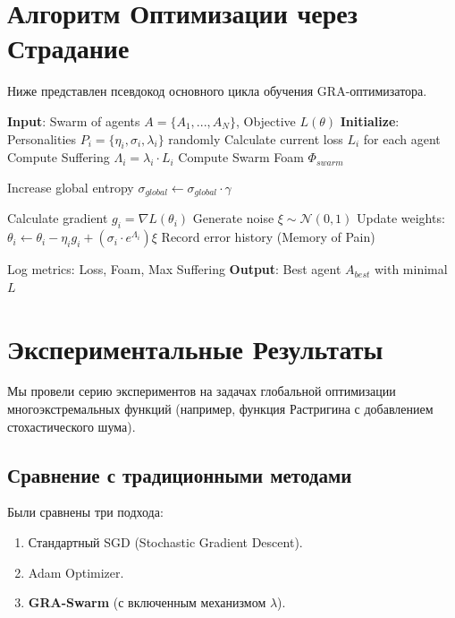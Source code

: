 \documentclass[12pt, a4paper]{article}
\begin{document}
\section{Алгоритм Оптимизации через Страдание}

Ниже представлен псевдокод основного цикла обучения GRA-оптимизатора.

\begin{algorithm}[H]
\caption{GRA Optimization Loop with Suffering Dynamics}
\begin{algorithmic}[1]
\State \textbf{Input}: Swarm of agents $A = \{A_1, ..., A_N\}$, Objective $L(\theta)$
\State \textbf{Initialize}: Personalities $P_i = \{\eta_i, \sigma_i, \lambda_i\}$ randomly
    \State Calculate current loss $L_i$ for each agent
    \State Compute Suffering $\Lambda_i = \lambda_i \cdot L_i$
    \State Compute Swarm Foam $\Phi_{swarm}$
    
     
        \State Increase global entropy $\sigma_{global} \leftarrow \sigma_{global} \cdot \gamma$
    \EndIf
    
        \State Calculate gradient $g_i = \nabla L(\theta_i)$
        \State Generate noise $\xi \sim \mathcal{N}(0, 1)$
        \State Update weights: $\theta_i \leftarrow \theta_i - \eta_i g_i + (\sigma_i \cdot e^{\Lambda_i}) \xi$
        \State Record error history (Memory of Pain)
    \EndFor
    
    \State Log metrics: Loss, Foam, Max Suffering
\EndFor
\State \textbf{Output}: Best agent $A_{best}$ with minimal $L$
\end{algorithmic}
\end{algorithm}

\section{Экспериментальные Результаты}

Мы провели серию экспериментов на задачах глобальной оптимизации многоэкстремальных функций (например, функция Растригина с добавлением стохастического шума).

\subsection{Сравнение с традиционными методами}
Были сравнены три подхода:
\begin{enumerate}
    \item Стандартный SGD (Stochastic Gradient Descent).
    \item Adam Optimizer.
    \item \textbf{GRA-Swarm} (с включенным механизмом $\lambda$).
\end{enumerate}
\end{document}
